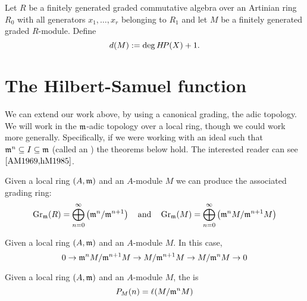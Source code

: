 \documentclass{ximera}
\begin{document}
\begin{definition}
  Let $R$ be a finitely generated graded commutative algebra over an
  Artinian ring $R_0$ with all generators $x_1,\dots,x_r$ belonging to
  $R_1$ and let $M$ be a finitely generated graded $R$-module.
  Define
  \[
  d(M) := \deg H\!P(X) + 1.
  \]
\end{definition}



\section{The Hilbert-Samuel function}

We can extend our work above, by using a canonical grading, the adic
topology. We will work in the $\mathfrak{m}$-adic topology over a local ring,
though we could work more generally. Specifically, if we were working
with an ideal such that $\mathfrak{m}^n\subseteq I \subseteq \mathfrak{m}$ (called an
) the theorems below hold. The interested
reader can see $\cite{AM1969,hM1985}$.

\begin{definition}
  Given a local ring $(A,\mathfrak{m})$ and an $A$-module $M$ we can produce the
  associated grading ring:
  \[
  \operatorname{Gr}_{\mathfrak{m}}(R) = \bigoplus_{n=0}^\infty \left(\mathfrak{m}^n/\mathfrak{m}^{n+1}\right) \quad\text{and}\quad
  \operatorname{Gr}_{\mathfrak{m}}(M) = \bigoplus_{n=0}^\infty \left(\mathfrak{m}^nM/\mathfrak{m}^{n+1}M\right)
  \]
\end{definition}

\begin{proposition}
  Given a local ring $(A,\mathfrak{m})$ and an $A$-module $M$. In this case,
  \[
  0 \to \mathfrak{m}^n M/\mathfrak{m}^{n+1}M \to M/\mathfrak{m}^{n+1}M \to M/\mathfrak{m}^n M \to 0
  \]
\end{proposition}


\begin{proposition}
  Given a local ring $(A,\mathfrak{m})$ and an $A$-module $M$, the
   is
  \[
  P_M(n) = \ell(M/\mathfrak{m}^n M)
  \]
\end{proposition}





\begin{theorem}
  
\end{theorem}
\end{document}
